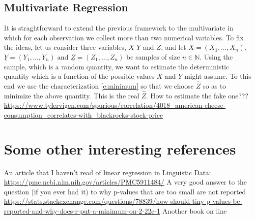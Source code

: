 	\subsection{ Multivariate Regression} 
		It is straghtforward to extend the previous framework to the multivariate in which for each observation we collect more than two numerical variables. To fix the ideas, let us consider three variables, $X$ $Y$ and $Z$, and let $\underline X = (X_1, \ldots, X_n)$, $\underline Y =(Y_1, \ldots, Y_n)$ and $\underline Z = (Z_1, \ldots, Z_n)$ be samples of size $n \in \mathbb N$. Using the sample, which is a random quantity, we want to estimate the deterministic quantity   
	which is a function of the possible values $X$ and $Y$ might assume. To this end we use the characterization \eqref{e:minimum}
	so that we choose $\hat Z$ so as to minimize the above quantity. This is the real $\hat Z$. How to estimate the fake one???
	\url{https://www.tylervigen.com/spurious/correlation/4018_american-cheese-consumption_correlates-with_blackrocks-stock-price}
	\section{Some other interesting references}

An article that I haven't read of linear regression in Linguistic Data: \url{https://pmc.ncbi.nlm.nih.gov/articles/PMC5911484/}
A very good answer to the question (if you ever had it) to why p-values that are too small are not reported \url{https://stats.stackexchange.com/questions/78839/how-should-tiny-p-values-be-reported-and-why-does-r-put-a-minimum-on-2-22e-1}
Another book on line
